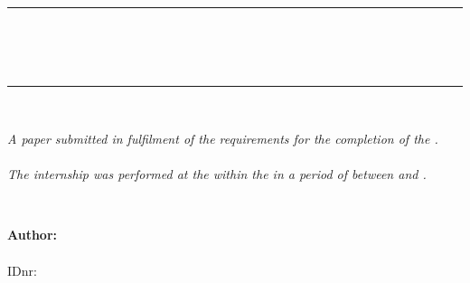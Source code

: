 \thispagestyle{empty}

\begin{center}
\textsc{\Large \myUni}\\[1.5cm]
\rule{\linewidth}{0.5mm} \\[0.4cm]
{ \huge \sffamily \bfseries \myTitle}\\[0.4cm]
{ \large  \mySubtitle}\\[0.4cm]
\rule{\linewidth}{0.5mm} \\[2cm]

\begin{minipage}[b]{0.76 \textwidth}
\textit{A paper submitted in fulfilment of the requirements for the completion of the \myProject. \\ \\The internship was performed at the \myOtherUni within the \myOtherGroup in a period of \myDuration  between \myStartDate and \myEndDate.}
\end{minipage} \\[2cm]

\end{center}

\begin{flushleft}
\textbf{\sffamily Author:}\\
\myName \\
IDnr:\quad \myID \\
\end{flushleft}

\cleardoublepage





